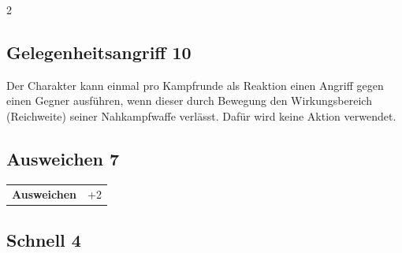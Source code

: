 \begin{multicols}{2}
\begin{tcolorbox}
\vspace{3mm}



\end{tcolorbox}

\begin{tcolorbox}
    \subsection*{Gelegenheitsangriff \hfill \small{10 }}
    \tcblower
Der Charakter kann einmal pro Kampfrunde als Reaktion einen Angriff gegen einen Gegner ausführen, wenn dieser durch Bewegung den Wirkungsbereich (Reichweite) seiner Nahkampfwaffe verlässt. Dafür wird keine Aktion verwendet.


\vspace{3mm}



\end{tcolorbox}

\begin{tcolorbox}
    \subsection*{Ausweichen \hfill \small{7 }}
    \tcblower




\begin{tabular}{@{}ll@{}}
    \textbf{Ausweichen} & +2\\
\end{tabular}


\end{tcolorbox}

\begin{tcolorbox}
    \subsection*{Schnell \hfill \small{4 }}
    \tcblower





\end{tcolorbox}
\end{multicols}
